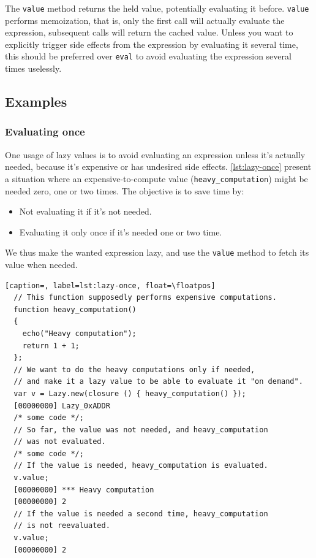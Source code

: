 \documentclass[openright,twoside,12pt]{report}
\newcommand   {\floatpos}          {htbp}
\newcommand{\lst}[1]{\autoref{lst:#1}}
\begin{document}
The \lstinline|value| method returns the held value, potentially
evaluating it before. \lstinline|value| performs memoization, that is,
only the first call will actually evaluate the expression, subsequent
calls will return the cached value. Unless you want to explicitly
trigger side effects from the expression by evaluating it several
time, this should be preferred over \lstinline|eval| to avoid
evaluating the expression several times uselessly.

\subsection{Examples}

\subsubsection{Evaluating once}

One usage of lazy values is to avoid evaluating an expression unless
it's actually needed, because it's expensive or has undesired side
effects. \lst{lazy-once} present a situation where an
expensive-to-compute value (\lstinline|heavy_computation|) might be
needed zero, one or two times. The objective is to save time by:

\begin{itemize}
\item Not evaluating it if it's not needed.
\item Evaluating it only once if it's needed one or two time.
\end{itemize}

We thus make the wanted expression lazy, and use the \lstinline|value|
method to fetch its value when needed.

\begin{lstlisting}[caption=, label=lst:lazy-once, float=\floatpos]
  // This function supposedly performs expensive computations.
  function heavy_computation()
  {
    echo("Heavy computation");
    return 1 + 1;
  };
  // We want to do the heavy computations only if needed,
  // and make it a lazy value to be able to evaluate it "on demand".
  var v = Lazy.new(closure () { heavy_computation() });
  [00000000] Lazy_0xADDR
  /* some code */;
  // So far, the value was not needed, and heavy_computation
  // was not evaluated.
  /* some code */;
  // If the value is needed, heavy_computation is evaluated.
  v.value;
  [00000000] *** Heavy computation
  [00000000] 2
  // If the value is needed a second time, heavy_computation
  // is not reevaluated.
  v.value;
  [00000000] 2
\end{lstlisting}
\end{document}
